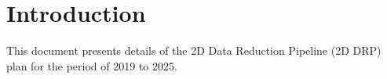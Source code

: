 \section{Introduction}

This document presents details of the 2D Data Reduction Pipeline (2D DRP) plan for the period of
2019 to 2025.



